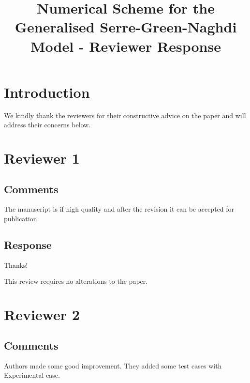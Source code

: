 \documentclass[10pt]{article}
\begin{document}
	\title{Numerical Scheme for the Generalised Serre-Green-Naghdi Model - Reviewer Response}
	
	\maketitle

\section{Introduction}

We kindly thank the reviewers for their constructive advice on the paper and will address their concerns below.
	
\section{Reviewer 1}
\subsection{Comments}
The manuscript is if high quality and after the revision it can be accepted for publication.
\subsection{Response}
Thanks!

This review requires no alterations to the paper.


\section{Reviewer 2}
\subsection{Comments}
Authors made some good improvement. They added some test cases with Experimental case.
\end{document}
